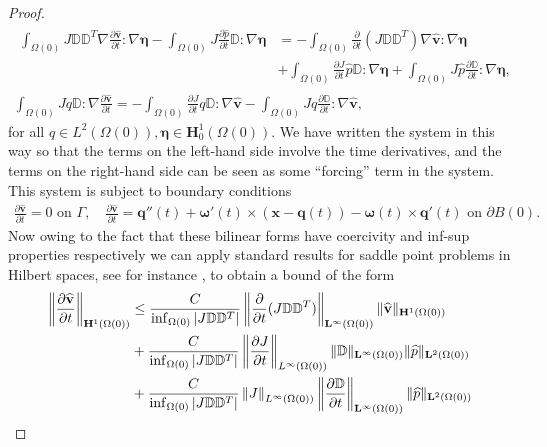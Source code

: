 \documentclass[a4paper]{amsart}
\numberwithin{equation}{section}
\newcommand{\ddt}[1]{\frac{\partial #1}{\partial t}}
\newcommand{\grad}{\nabla}
\theoremstyle{plain}
\newcommand{\mbf}[1]{\mathbf{#1}}
\newcommand{\mbb}[1]{\mathbb{#1}}
\begin{document}
\begin{proof}
\begin{gather}
    \begin{aligned}
    \int_{\Omega(0)} J \mbb{D} \mbb{D}^T \grad \ddt{\widehat{\mbf{v}}}:\grad \boldsymbol{\eta} - \int_{\Omega(0)} J \ddt{\widehat{p}} \mbb{D}: \grad \boldsymbol{\eta} 
        &= -\int_{\Omega(0)} \ddt{}(J \mbb{D} \mbb{D}^T) \grad \widehat{\mbf{v}}:\grad \boldsymbol{\eta}\\
        &+ \int_{\Omega(0)} \ddt{J} \widehat{p} \mbb{D}: \grad \boldsymbol{\eta} + \int_{\Omega(0)} J \widehat{p} \ddt{\mbb{D}}: \grad \boldsymbol{\eta},
    \end{aligned}\label{eqn: stokes pullback1}\\
    \int_{\Omega(0)} J q \mbb{D}: \grad \ddt{\widehat{\mbf{v}}} = -\int_{\Omega(0)} \ddt{J} q \mbb{D} :\grad \widehat{\mbf{v}} -\int_{\Omega(0)} J q \ddt{\mbb{D}} :\grad \widehat{\mbf{v}}, \label{eqn: stokes pullback2}
\end{gather}
for all $q \in L^2(\Omega(0)), \boldsymbol{\eta} \in \mbf{H}_0^1(\Omega(0))$.
We have written the system in this way so that the terms on the left-hand side involve the time derivatives, and the terms on the right-hand side can be seen as some ``forcing'' term in the system.
This system is subject to boundary conditions
\begin{align*} \ddt{\widehat{\mbf{v}}} = 0 \text{ on } \Gamma, \quad \ddt{\widehat{\mbf{v}}} = \mbf{q}''(t) + \boldsymbol{\omega}'(t)\times(\mbf{x} - \mbf{q}(t)) - \boldsymbol{\omega}(t) \times \mbf{q}'(t) \text{ on } \partial B(0).
\end{align*}
Now owing to the fact that these bilinear forms have coercivity and inf-sup properties respectively we can apply standard results for saddle point problems in Hilbert spaces, see for instance \cite[Chapter 4]{Boffi13Book}, to obtain a bound of the form
\begin{align}
    \left\|  \ddt{\widehat{\mbf{v}}} \right\|_{\mbf{H}^1(\Omega(0))} &\leq \frac{C}{\inf_{\Omega(0)} |J \mbb{D} \mbb{D}^T|} \left\| \ddt{}(J \mbb{D} \mbb{D}^T) \right\|_{\mbf{L}^\infty(\Omega(0))}\|\widehat{\mbf{v}}\|_{\mbf{H}^1(\Omega(0))} \notag \\
    &+ \frac{C}{\inf_{\Omega(0)} |J \mbb{D} \mbb{D}^T|} \left\| \ddt{J} \right\|_{L^\infty(\Omega(0))} \| \mbb{D} \|_{\mbf{L}^\infty(\Omega(0))} \|\widehat{p}\|_{\mbf{L}^2(\Omega(0))}\notag \\
    &+ \frac{C}{\inf_{\Omega(0)} |J \mbb{D} \mbb{D}^T|}\left\| J\right\|_{L^\infty(\Omega(0))} \left\| \ddt{\mbb{D}} \right\|_{\mbf{L}^\infty(\Omega(0))} \|\widehat{p}\|_{\mbf{L}^2(\Omega(0))} \notag \\

\end{align}
\end{proof}
\end{document}
